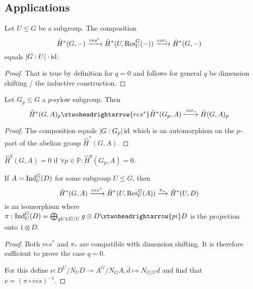 \documentclass[fontsize=11pt,fleqn,a4paper]{scrartcl}
\begin{document}
\subsection{Applications}

\begin{theorem}
Let $U\leq G$ be a subgroup. The composition
\[\hat{H}^\ast(G,-) \xrightarrow{res^\ast} \hat{H}^\ast(U,\operatorname{Res}_U^G(-)) \xrightarrow{cor_\ast} \hat{H}^\ast(G,-)\]
equals $\lvert G:U\rvert\cdot\operatorname{id}$.
\end{theorem}
\begin{proof}
That is true by definition for $q=0$ and follows for general $q$ be dimension shifting / the inductive construction.
\end{proof}

\begin{theorem}
\end{theorem}

\begin{theorem}
Let $G_p\leq G$ a $p$-sylow subgroup. Then
\[\hat{H}^\ast(G,A)_p \xtwoheadrightarrow{res^\ast} \hat{H}^\ast(G_p,A) \xhookrightarrow{cor_\ast} \hat{H}(G,A)_p\]
\end{theorem}
\begin{proof}
The composition equals $\lvert G:G_p\rvert\operatorname{id}$ which is an automorphism on the $p$-part of the abelian group $\hat{H}^\ast(G,A)$.
\end{proof}

\begin{corollary}
$\hat{H}^q(G,A)=0$ if $\forall p\in\mathbb{P}: \hat{H}^q(G_p,A)=0$.
\end{corollary}

\begin{definition}
\end{definition}

\begin{theorem}
If $A=\operatorname{Ind}_U^G(D)$ for some subgroup $U\leq G$, then
\[\hat{H}^\ast(G,A) \xrightarrow{res^\ast} \hat{H}^\ast(U,\operatorname{Res}_U^G(A)) \xrightarrow{\pi_\ast} \hat{H}^\ast(U,D)\]
is an isomorphism where $\pi: \Ind_U^G(D) = \bigoplus_{gU\in G/U} g\otimes D \xtwoheadrightarrow{pi} D$ is the projection onto $1\otimes D$.
\end{theorem}
\begin{proof}
Both $res^\ast$ and $\pi_\ast$ are compatible with dimension shifting. It is therefore sufficient to prove the case $q=0$.

For this define $\nu: D^U / N_U D \to A^G/N_G A, \overline{d} \mapsto N_{G/U} \overline{d}$ and find that $\nu=(\pi\circ res)^{-1}$. 
\end{proof}
\end{document}

